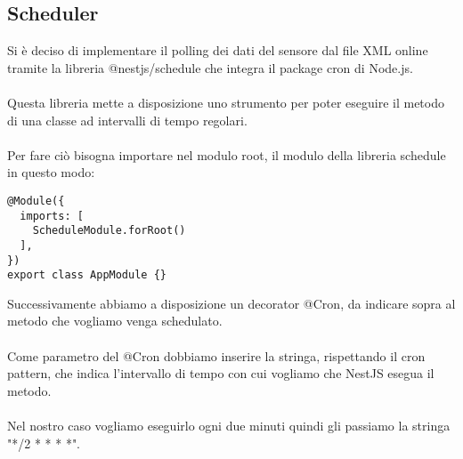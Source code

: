 \subsection{Scheduler}
Si è deciso di implementare il polling dei dati del sensore dal file XML online
tramite la libreria @nestjs/schedule che integra il package cron di Node.js.
\\\\
Questa libreria mette a disposizione uno strumento per poter eseguire il metodo
di una classe ad intervalli di tempo regolari.
\\\\
Per fare ciò bisogna importare nel modulo root, il modulo della libreria schedule in questo modo:
\begin{lstlisting}
@Module({
  imports: [
    ScheduleModule.forRoot()
  ],
})
export class AppModule {}
\end{lstlisting}
\leavevmode\newline
Successivamente abbiamo a disposizione un decorator @Cron, da indicare sopra al metodo che vogliamo venga 
schedulato. 
\\\\
Come parametro del @Cron dobbiamo inserire la stringa, rispettando il cron pattern, che indica
l'intervallo di tempo con cui vogliamo che NestJS esegua il metodo.
\\\\
Nel nostro caso vogliamo eseguirlo ogni due minuti quindi gli passiamo la stringa "*/2 * * * *".

